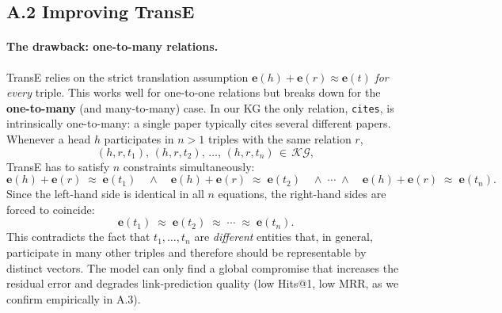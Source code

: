 \documentclass{article}
\begin{document}
\subsection*{A.2 \hspace{0.3em} Improving TransE}


\paragraph{The drawback: one-to-many relations.}
TransE relies on the strict translation assumption
$\mathbf{e}(h) + \mathbf{e}(r) \approx \mathbf{e}(t)$ \emph{for every} triple.
This works well for one-to-one relations but breaks down for the
\textbf{one-to-many} (and many-to-many) case. In our KG the only relation,
\texttt{cites}, is intrinsically one-to-many: a single paper typically cites
several different papers. Whenever a head $h$ participates in $n>1$ triples
with the same relation $r$,
\begin{equation}
    (h, r, t_1),\, (h, r, t_2),\, \dots,\, (h, r, t_n) \,\in\, \mathcal{KG},
\end{equation}
TransE has to satisfy $n$ constraints simultaneously:
\begin{equation}
    \mathbf{e}(h) + \mathbf{e}(r) \;\approx\; \mathbf{e}(t_1)
    \quad\wedge\quad
    \mathbf{e}(h) + \mathbf{e}(r) \;\approx\; \mathbf{e}(t_2)
    \quad\wedge\;\cdots\;\wedge\quad
    \mathbf{e}(h) + \mathbf{e}(r) \;\approx\; \mathbf{e}(t_n).
\end{equation}
Since the left-hand side is identical in all $n$ equations, the right-hand
sides are forced to coincide:
\begin{equation}
    \mathbf{e}(t_1) \;\approx\; \mathbf{e}(t_2) \;\approx\; \cdots
    \;\approx\; \mathbf{e}(t_n).
\end{equation}
This contradicts the fact that $t_1,\dots,t_n$ are \emph{different} entities
that, in general, participate in many other triples and therefore should be
representable by distinct vectors. The model can only find a global compromise
that increases the residual error and degrades link-prediction quality (low
Hits@1, low MRR, as we confirm empirically in A.3).
\end{document}
